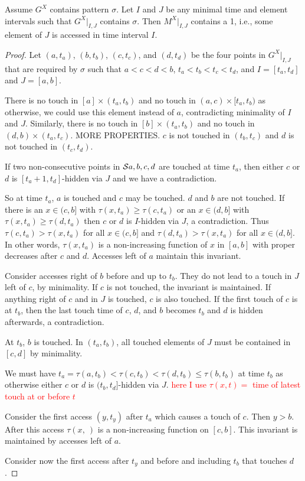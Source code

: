 \begin{theorem} Assume $G^X$ contains pattern $\sigma$. Let $I$ and $J$ be any minimal time and element intervals such that $G^X |_{I,J}$ contains $\sigma$. Then $M^X |_{I,J}$ contains a 1, i.e., some element of $J$ is accessed in time interval $I$. 
\end{theorem}
\begin{proof}
Let $(a,t_a)$, $(b,t_b)$, $(c,t_c)$, and $(d,t_d)$ be the four points in $G^X |_{I,J}$ that are required by $\sigma$ such that $a < c < d < b$, $t_a < t_b < t_c < t_d$, and $I = [t_a,t_d]$ and $J = [a,b]$. 

There is no touch in $[a] \times (t_a,t_b)$ and no touch in $(a,c) \times [t_a,t_b)$ as otherwise, we could use this element instead of $a$, contradicting minimality of $I$ and $J$. Similarly, there is no touch in $[b] \times (t_a,t_b)$ and no touch in $(d,b) \times (t_a, t_c)$. MORE PROPERTIES.
$c$ is not touched in $(t_b,t_c)$ and $d$ is not touched in $(t_c,t_d)$. 

If two non-consecutive points in ${\mathcal{S}}{a,b,c,d}$ are touched at time $t_a$, then either $c$ or $d$ is $[t_a+1,t_d]$-hidden via $J$ and we have a contradiction. 


So at time $t_a$, $a$ is touched and $c$ may be touched. $d$ and $b$ are not touched. If there is an $x \in (c,b]$ with $\tau(x,t_a) \ge \tau(c,t_a)$ or an $x \in (d,b]$ with $\tau(x,t_a) \ge \tau(d,t_a)$ then $c$ or $d$ is $I$-hidden via $J$, a contradiction. Thus $\tau(c,t_a) > \tau(x,t_a)$ for all $x \in (c,b]$ and $\tau(d,t_a) > \tau(x,t_a)$ for all $x \in (d,b]$. In other words, $\tau(x,t_a)$ is a non-increasing function of $x$ in $[a,b]$ with proper decreases after $c$ and $d$. Accesses left of $a$ maintain this invariant. 

Consider accesses right of $b$ before and up to $t_b$. They do not lead to a touch in $J$ left of $c$, by minimality. 
If $c$ is not touched, the invariant is maintained. If anything right of $c$ and in $J$ is touched, $c$ is also touched. 
If the first touch of $c$ is at $t_b$, then the last touch time of $c$, $d$, and $b$ becomes $t_b$ and $d$ is hidden afterwards, a contradiction. 

At $t_b$, $b$ is touched. In $(t_a,t_b)$, all touched elements of $J$ must be contained in $[c,d]$ by minimality. 

We must have $t_a = \tau(a,t_b) < \tau(c,t_b) < \tau(d,t_b) \le \tau(b,t_b)$ at time $t_b$ as otherwise either $c$ or $d$ is $(t_b,t_d]$-hidden via $J$.   \textcolor{red}{here I use $\tau(x,t) = $ time of latest touch at or before $t$}

Consider the first access $(y,t_y)$ after $t_a$ which causes a touch of $c$. Then $y > b$. After this access $\tau(x,\ )$ is a non-increasing function on $[c,b]$. This invariant is maintained by accesses left of $a$. 

Consider now the first access after $t_y$ and before and including $t_b$ that touches $d$. 
\end{proof}
\fi


